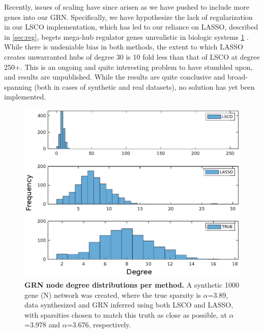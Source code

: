 Recently, issues of scaling have since arisen as we have pushed to include more genes into our GRN. Specifically, we have hypothesize the lack of regularization in our LSCO implementation, which has led to our reliance on LASSO, described in \cref{sec:reg}, begets mega-hub regulator genes unrealistic in biologic systems \cref{fig:hubiness} \citep{bock2012hub}. While there is undeniable bias in both methods, the extent to which LASSO creates unwarranted hubs of degree 30 is 10 fold less than that of LSCO at degree 250+. This is an ongoing and quite interesting problem to have stumbled upon, and results are unpublished. While the results are quite conclusive and broad-spanning (both in cases of synthetic and real datasets), no solution has yet been implemented.

\begin{figure}[H]
\centering
\includegraphics[width=1\linewidth]{3/hubs.eps}
\caption{\textbf{GRN node degree distributions per method.} A synthetic 1000 gene (N) network was created, where the true sparsity is $\alpha$=3.89, data synthesized and GRN inferred using both LSCO and LASSO, with sparsities chosen to match this truth as close as possible, at $\alpha$=3.978 and $\alpha$=3.676, respectively.}
\label{fig:hubiness}
\end{figure}




